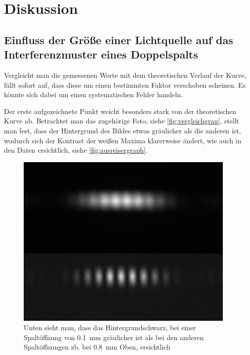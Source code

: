 \documentclass[11pt,ngerman]{scrartcl}
\begin{document}
\section{Diskussion}\label{disk}

\subsection{Einfluss der Größe einer Lichtquelle auf das Interferenzmuster
	eines Doppelspalts}

Vergleicht man die gemessenen Werte mit dem theoretischen Verlauf der Kurve,
fällt sofort auf, dass diese um einen bestimmten Faktor verschoben scheinen. Es
könnte sich dabei um einen systematischen Fehler handeln.

\noindent Der erste aufgezeichnete Punkt weicht besonders stark von der theoretischen
Kurve ab. Betrachtet man das zugehörige Foto, siehe
\autoref{fig:vergleichgrau}, stellt man fest, dass der Hintergrund des Bildes
etwas gräulicher als die anderen ist, wodurch sich der Kontrast der weißen
Maxima klarerweise ändert, wie auch in den Daten ersichtlich, siehe \autoref{fig:ausreisergraph}.

\begin{figure}[H]
	\begin{center}
		\includegraphics[width=0.95\textwidth]{./Interfero/Versuch1/vergleich.png}
	\end{center}
	\caption{Unten sieht man, dass das Hintergrundschwarz, bei
		einer Spaltöffnung von \SI{0.1}{\mm} gräulicher ist als bei den anderen
		Spaltöffnungen zb. bei \SI{0.8}{\mm} Oben, ersichtlich}
	\label{fig:vergleichgrau}
\end{figure}
\end{document}

